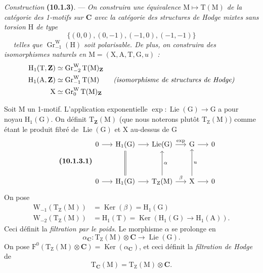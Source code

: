 \documentclass[11pt,leqno]{article}
\newcommand{\Page}[1]{\ifvmode\noindent\else\unskip\ \fi{\footnotesize\textcolor{gray}{[p.\,#1]}}\ \ignorespaces}
\begin{document}
\textit{Construction} \textbf{(10.1.3)}. —
\textit{On construira une équivalence
\(\mathrm{M}\mapsto\mathrm{T}(\mathrm{M})\) de la catégorie des
1-motifs sur \(\mathbf{C}\) avec la catégorie des structures de Hodge
mixtes sans torsion \(\mathrm{H}\) de type}
\[
\{(0,0),(0,-1),(-1,0),(-1,-1)\}
\]
\Page{54}
\textit{telles que \(\operatorname{Gr}^{\mathrm{W}}_{-1}(\mathrm{H})\)
soit polarisable. De plus, on construira des isomorphismes naturels en
\(\mathrm{M}=(\mathrm{X},\mathrm{A},\mathrm{T},\mathrm{G},u)\) :}
\[
\begin{aligned}
\mathrm{H}_1(\mathrm{T},\mathbf{Z})
  &\simeq \operatorname{Gr}^{\mathrm{W}}_{-2}
          \mathrm{T}(\mathrm{M})_{\mathbf{Z}}
\\
\mathrm{H}_1(\mathrm{A},\mathbf{Z})
  &\simeq \operatorname{Gr}^{\mathrm{W}}_{-1}\mathrm{T}(\mathrm{M})
  \qquad \text{\textit{(isomorphisme de structures de Hodge)}}
\\
\mathrm{X}
  &\simeq \operatorname{Gr}^{\mathrm{W}}_0
          \mathrm{T}(\mathrm{M})_{\mathbf{Z}}
\end{aligned}
\]

Soit \(\mathrm{M}\) un 1-motif. L’application exponentielle
\(\exp:\operatorname{Lie}(\mathrm{G})\to\mathrm{G}\) a pour noyau
\(\mathrm{H}_1(\mathrm{G})\). On définit
\(\mathrm{T}_{\mathbf{Z}}(\mathrm{M})\) (que nous noterons plutôt
\(\mathrm{T}_{\mathrm{Z}}(\mathrm{M})\)) comme étant le produit fibré
de \(\operatorname{Lie}(\mathrm{G})\) et \(\mathrm{X}\) au-dessus de
\(\mathrm{G}\)
\[
\tag*{\textbf{(10.1.3.1)}}
\begin{tikzcd}[column sep=1.5em, row sep=3.5em]
0 \arrow[r]
& \mathrm{H}_1(\mathrm{G}) \arrow[r]
& \operatorname{Lie}(\mathrm{G}) \arrow[r, "\exp"]
& \mathrm{G} \arrow[r]
& 0
\\
0 \arrow[r]
& \mathrm{H}_1(\mathrm{G}) \arrow[r] \arrow[u, equal]
& \mathrm{T}_{\mathrm{Z}}(\mathrm{M})
    \arrow[r, "\beta"] \arrow[u, "\alpha"']
& \mathrm{X} \arrow[r] \arrow[u, "u"']
& 0
\end{tikzcd}
\]
On pose
\[
\begin{aligned}
\mathrm{W}_{-1}(\mathrm{T}_{\mathrm{Z}}(\mathrm{M}))
  &=\operatorname{Ker}(\beta)=\mathrm{H}_1(\mathrm{G})
\\
\mathrm{W}_{-2}(\mathrm{T}_{\mathrm{Z}}(\mathrm{M}))
  &=\mathrm{H}_1(\mathrm{T})
    =\operatorname{Ker}(\mathrm{H}_1(\mathrm{G})\to\mathrm{H}_1(\mathrm{A})).
\end{aligned}
\]
Ceci définit la \textit{filtration par le poids}. Le morphisme
\(\alpha\) se prolonge en
\[
\alpha_{\mathbf{C}}:
\mathrm{T}_{\mathrm{Z}}(\mathrm{M})\otimes\mathbf{C}
\to\operatorname{Lie}(\mathrm{G}).
\]
On pose
\(\mathrm{F}^0(\mathrm{T}_{\mathrm{Z}}(\mathrm{M})\otimes\mathbf{C})
=\operatorname{Ker}(\alpha_{\mathbf{C}})\), et ceci définit la
\textit{filtration de Hodge} de
\[
\mathrm{T}_{\mathbf{C}}(\mathrm{M})
=\mathrm{T}_{\mathrm{Z}}(\mathrm{M})\otimes\mathbf{C}.
\]
\end{document}
